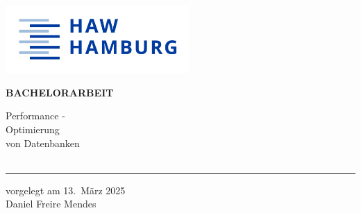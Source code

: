 \begin{titlepage}
  \color{haw}
  \raggedright
  \hfill\includegraphics[width=7cm]{PNGs/General/HAW_Marke_RGB_300dpi}\\

  \vspace{5cm}

  \setmainfont{Open Sans}
  \small
  \textbf{BACHELORARBEIT}

  \vspace{8mm}

  \begin{minipage}{0.8\linewidth}
    \setmainfont{Martel Heavy}
    \LARGE
    Performance -\\[1mm]
    Optimierung\\[1mm]
    von Datenbanken\\
    \,\rule{11mm}{1.2mm}
  \end{minipage}

  \vspace{1cm}

  vorgelegt am 13.\ März 2025\\
  Daniel Freire Mendes

  \vspace{5cm}


\end{titlepage}
